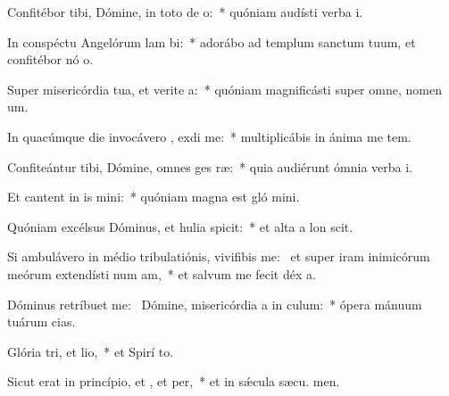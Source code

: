 \item Confitébor tibi, Dómine, in toto de o:~* quóniam audísti verba  i.
\item In conspéctu Angelórum lam bi:~* adorábo ad templum sanctum tuum, et confitébor nó o.
\item Super misericórdia tua, et verite a:~* quóniam magnificásti super omne, nomen  um.
\item In quacúmque die invocávero , exdi me:~* multiplicábis in ánima me tem.
\item Confiteántur tibi, Dómine, omnes ges ræ:~* quia audiérunt ómnia verba  i.
\item Et cantent in is mini:~* quóniam magna est gló mini.
\item Quóniam excélsus Dóminus, et hulia spicit:~* et alta a lon scit.
\item Si ambulávero in médio tribulatiónis, vivifibis me:~\pscross{} et super iram inimicórum meórum extendísti num am,~* et salvum me fecit déx a.
\item Dóminus retríbuet  me:~\pscross{} Dómine, misericórdia a in culum:~* ópera mánuum tuárum  cias.
\item Glória tri, et lio,~* et Spirí to.
\item Sicut erat in princípio, et , et per,~* et in sǽcula sæcu. men.
